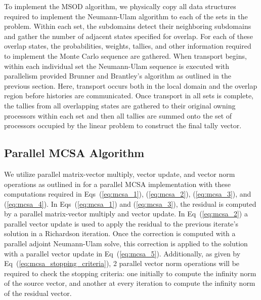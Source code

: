 \documentclass{snamc2013}
\begin{document}
To implement the MSOD algorithm, we physically copy all data
structures required to implement the Neumann-Ulam algorithm to each of
the sets in the problem. Within each set, the subdomains detect their
neighboring subdomains and gather the number of adjacent states
specified for overlap. For each of these overlap states, the
probabilities, weights, tallies, and other information required to
implement the Monte Carlo sequence are gathered. When transport
begins, within each individual set the Neumann-Ulam sequence is
executed with parallelism provided Brunner and Brantley's algorithm as
outlined in the previous section. Here, transport occurs both in the
local domain and the overlap region before histories are
communicated. Once transport in all sets is complete, the tallies
from all overlapping states are gathered to their original owning
processors within each set and then all tallies are summed onto the
set of processors occupied by the linear problem to construct the
final tally vector.

\subsection{Parallel MCSA Algorithm}
We utilize parallel matrix-vector multiply, vector update, and vector
norm operations as outlined in \cite{saad_iterative_2003} for a
parallel MCSA implementation with these computations required in
Eqs~(\ref{eq:mcsa_1}), (\ref{eq:mcsa_2}), (\ref{eq:mcsa_3}), and
(\ref{eq:mcsa_4}). In Eqs~(\ref{eq:mcsa_1}) and (\ref{eq:mcsa_3}), the
residual is computed by a parallel matrix-vector multiply and vector
update. In Eq~(\ref{eq:mcsa_2}) a parallel vector update is used to
apply the residual to the previous iterate's solution in a Richardson
iteration. Once the correction is computed with a parallel adjoint
Neumann-Ulam solve, this correction is applied to the solution with a
parallel vector update in Eq~(\ref{eq:mcsa_5}). Additionally, as given
by Eq~(\ref{eq:mcsa_stopping_criteria}), 2 parallel vector norm
operations will be required to check the stopping criteria: one
initially to compute the infinity norm of the source vector, and
another at every iteration to compute the infinity norm of the
residual vector.
\end{document}
